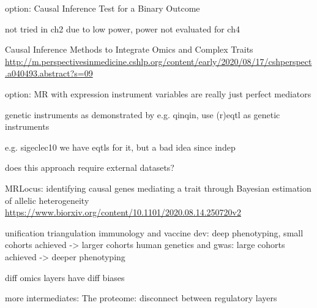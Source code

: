 \begin{outline}
    option:
        Causal Inference Test for a Binary Outcome

            not tried in ch2 due to low power, power not evaluated for ch4

            Causal Inference Methods to Integrate Omics and Complex Traits
            \url{http://m.perspectivesinmedicine.cshlp.org/content/early/2020/08/17/cshperspect.a040493.abstract?s=09}


    option: MR with expression 
        instrument variables are really just perfect mediators

        genetic instruments
        as demonstrated by e.g. qinqin, use (r)eqtl as genetic instruments

        e.g. sigeclec10
        we have eqtls for it, but a bad idea since indep

        does this approach require external datasets?

        MRLocus: identifying causal genes mediating a trait through Bayesian estimation of allelic heterogeneity
        \url{https://www.biorxiv.org/content/10.1101/2020.08.14.250720v2}

unification
    triangulation
    immunology and vaccine dev: deep phenotyping, small cohorts achieved -> larger cohorts
    human genetics and gwas: large cohorts achieved -> deeper phenotyping

    diff omics layers have diff biases

    more intermediates:
        The proteome: disconnect between regulatory layers


\end{outline}

